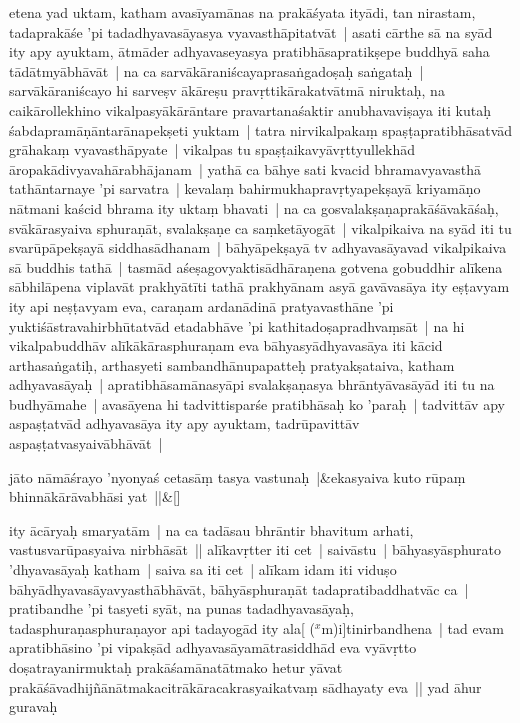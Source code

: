 \documentclass[article,12pt,a4paper]{memoir}
\newcommand{\corr}[1]{($^{x}$#1)}
\begin{document}
	  \pstart etena yad uktam, katham avasīyamānas  na prakāśyata ityādi, tan nirastam, tadaprakāśe 'pi tadadhyavasāyasya vyavasthāpitatvāt | asati cārthe sā na syād ity apy ayuktam, ātmāder adhyavaseyasya pratibhāsapratikṣepe buddhyā saha tādātmyābhāvāt | na ca sarvākāraniścayaprasaṅgadoṣaḥ saṅgataḥ | sarvākāraniścayo hi sarveṣv ākāreṣu pravṛttikārakatvātmā niruktaḥ, na caikārollekhino vikalpasyākārāntare pravartanaśaktir anubhavaviṣaya iti kutaḥ śabdapramāṇāntarānapekṣeti yuktam | tatra nirvikalpakaṃ spaṣṭapratibhāsatvād grāhakaṃ vyavasthāpyate | vikalpas tu spaṣṭaikavyāvṛttyullekhād āropakādivyavahārabhājanam | yathā ca bāhye sati kvacid bhramavyavasthā tathāntarnaye 'pi sarvatra | kevalaṃ bahirmukhapravṛtyapekṣayā kriyamāṇo nātmani kaścid bhrama ity uktaṃ bhavati | na ca gosvalakṣaṇaprakāśāvakāśaḥ, svākārasyaiva sphuraṇāt, svalakṣaṇe ca saṃketāyogāt | vikalpikaiva na syād iti tu svarūpāpekṣayā siddhasādhanam | bāhyāpekṣayā tv adhyavasāyavad vikalpikaiva sā buddhis tathā | tasmād aśeṣagovyaktisādhāraṇena gotvena gobuddhir alīkena sābhilāpena viplavāt prakhyātīti tathā prakhyānam asyā gavāvasāya ity eṣṭavyam ity api neṣṭavyam eva, caraṇam ardanādinā pratyavasthāne 'pi yuktiśāstravahirbhūtatvād etadabhāve 'pi kathitadoṣapradhvaṃsāt | na hi vikalpabuddhāv alīkākārasphuraṇam eva bāhyasyādhyavasāya iti kācid arthasaṅgatiḥ, arthasyeti sambandhānupapatteḥ  pratyakṣataiva, katham adhyavasāyaḥ | apratibhāsamānasyāpi svalakṣaṇasya bhrāntyāvasāyād iti tu na budhyāmahe | avasāyena hi tadvittisparśe pratibhāsaḥ ko 'paraḥ | tadvittāv apy aspaṣṭatvād adhyavasāya ity apy ayuktam, tadrūpavittāv aspaṣṭatvasyaivābhāvāt |
	\pend
      
	    
	    \stanza[\smallbreak]
	jāto nāmāśrayo 'nyonyaś cetasāṃ tasya vastunaḥ |&ekasyaiva kuto rūpaṃ bhinnākārāvabhāsi yat ||\&[\smallbreak]


	

	  \pstart ity ācāryaḥ smaryatām | na ca tadāsau bhrāntir bhavitum arhati, vastusvarūpasyaiva nirbhāsāt || \label{thakur75-141.3} alīkavṛtter iti cet | saivāstu | bāhyasyāsphurato 'dhyavasāyaḥ katham | saiva sa iti cet | alīkam idam iti viduṣo bāhyādhyavasāyavyasthābhāvāt, bāhyāsphuraṇāt tadapratibaddhatvāc ca | pratibandhe 'pi tasyeti syāt, na punas tadadhyavasāyaḥ, tadasphuraṇasphuraṇayor api tadayogād ity ala[ {\corr mi}]tinirbandhena | tad evam apratibhāsino 'pi vipakṣād adhyavasāyamātrasiddhād eva vyāvṛtto doṣatrayanirmuktaḥ prakāśamānatātmako hetur yāvat prakāśāvadhijñānātmakacitrākāracakrasyaikatvaṃ sādhayaty eva || yad āhur guravaḥ
	\pend
      
\end{document}
